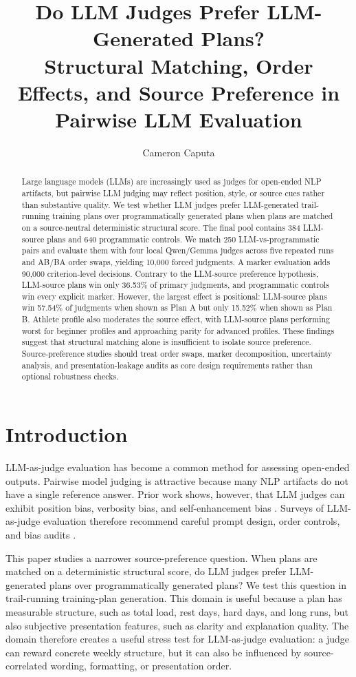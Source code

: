 \documentclass[11pt]{article}
\title{Do LLM Judges Prefer LLM-Generated Plans?\\
Structural Matching, Order Effects, and Source Preference in Pairwise LLM Evaluation}
\author{Cameron Caputa \\
}
\begin{document}
\maketitle
\begin{abstract}
Large language models (LLMs) are increasingly used as judges for open-ended NLP artifacts, but pairwise LLM judging may reflect position, style, or source cues rather than substantive quality. We test whether LLM judges prefer LLM-generated trail-running training plans over programmatically generated plans when plans are matched on a source-neutral deterministic structural score. The final pool contains 384 LLM-source plans and 640 programmatic controls. We match 250 LLM-vs-programmatic pairs and evaluate them with four local Qwen/Gemma judges across five repeated runs and AB/BA order swaps, yielding 10,000 forced judgments. A marker evaluation adds 90,000 criterion-level decisions. Contrary to the LLM-source preference hypothesis, LLM-source plans win only 36.53\% of primary judgments, and programmatic controls win every explicit marker. However, the largest effect is positional: LLM-source plans win 57.54\% of judgments when shown as Plan A but only 15.52\% when shown as Plan B. Athlete profile also moderates the source effect, with LLM-source plans performing worst for beginner profiles and approaching parity for advanced profiles. These findings suggest that structural matching alone is insufficient to isolate source preference. Source-preference studies should treat order swaps, marker decomposition, uncertainty analysis, and presentation-leakage audits as core design requirements rather than optional robustness checks.
\end{abstract}

\section{Introduction}

LLM-as-judge evaluation has become a common method for assessing open-ended outputs. Pairwise model judging is attractive because many NLP artifacts do not have a single reference answer. Prior work shows, however, that LLM judges can exhibit position bias, verbosity bias, and self-enhancement bias \citep{zheng2023llmasajudge}. Surveys of LLM-as-judge evaluation therefore recommend careful prompt design, order controls, and bias audits \citep{gu2024language}.

This paper studies a narrower source-preference question. When plans are matched on a deterministic structural score, do LLM judges prefer LLM-generated plans over programmatically generated plans? We test this question in trail-running training-plan generation. This domain is useful because a plan has measurable structure, such as total load, rest days, hard days, and long runs, but also subjective presentation features, such as clarity and explanation quality. The domain therefore creates a useful stress test for LLM-as-judge evaluation: a judge can reward concrete weekly structure, but it can also be influenced by source-correlated wording, formatting, or presentation order.
\end{document}
